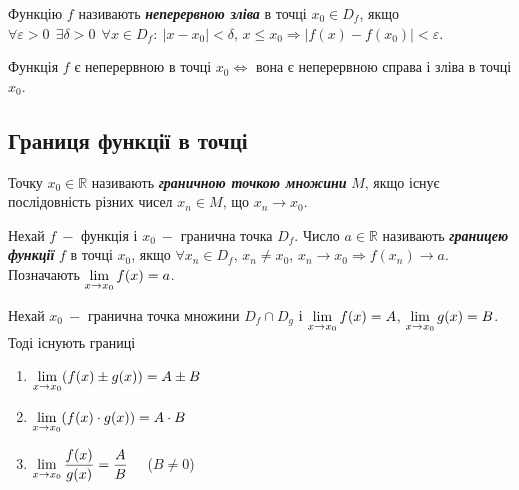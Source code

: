 \begin{definition}[за Коші]
      Функцію $f$ називають \textcolor{NavyBlue}{\textbf{\textit{{неперервною зліва}}}} в точці $x_0 \in D_f$,  якщо \newline $\forall \varepsilon > 0  \ \ \exists \delta > 0 \  \ \forall x \in D_f: \ |x - x_0| < \delta$, $ x \leqslant  x_0 \Rightarrow |f(x) - f(x_0)| < \varepsilon.$          
\end{definition}

\begin{theorem}
       Функція $f$ є неперервною в точці $x_0 \iff$ вона є неперервною справа і зліва в точці $x_0.$
\end{theorem}

\subsection{\large{Границя функції в точці}}

\begin{definition}
      Точку $x_0 \in \mathbb{R}$ називають \textcolor{NavyBlue}{\textbf{\textit{{граничною точкою множини}}}} $M$, якщо існує послідовність різних чисел $x_n \in M$, що $x_n \to x_0.$
\end{definition}

\begin{definition}[за Гейне]
      Нехай $f \:- $ функція і $x_0 \:- $ гранична точка $D_f.$ Число $a \in \mathbb{R}$ називають \textcolor{NavyBlue}{\textbf{\textit{{границею функції}}}} $f$ в точці $x_0$, якщо  $\forall x_n \in D_f$, $x_n \neq x_0$, $x_n \to x_0 \Rightarrow f(x_n) \to a.$ Позначають $\displaystyle\lim\limits_{x \rightarrow x_0} f(x)=a$.
\end{definition}

\begin{theorem}
       Нехай $x_0 \:-$ гранична точка множини $D_f \cap D_g$ і $\displaystyle\lim\limits_{x \to x_0} f(x) = A$, $\displaystyle\lim\limits_{x \to x_0} g(x) = B$. Тоді існують границі
       \begin{enumerate}
           \item $\displaystyle\lim\limits_{x \to x_0} (f(x) \pm g(x)) = A \pm B$
           \item $\displaystyle\lim\limits_{x \to x_0} (f(x) \cdot g(x)) = A \cdot B$
           \item $\displaystyle\lim\limits_{x \to x_0} \dfrac{f(x)}{g(x)} = \dfrac{A}{B}$ \ \ ($B \neq 0$)
       \end{enumerate}
\end{theorem}

